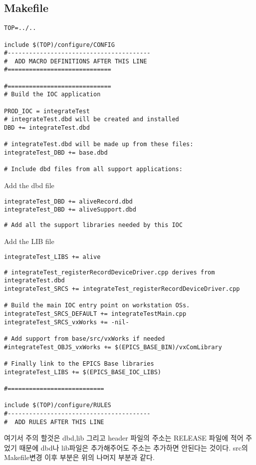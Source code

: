 \documentclass[11pt
  , a4paper
  , article
  , oneside
]{memoir}
\begin{document}
\subsection{Makefile}
\begin{lstlisting}[style=termstyle]
TOP=../..

include $(TOP)/configure/CONFIG
#----------------------------------------
#  ADD MACRO DEFINITIONS AFTER THIS LINE
#=============================

#=============================
# Build the IOC application

PROD_IOC = integrateTest
# integrateTest.dbd will be created and installed
DBD += integrateTest.dbd

# integrateTest.dbd will be made up from these files:
integrateTest_DBD += base.dbd

# Include dbd files from all support applications:
\end{lstlisting}
Add the dbd file
\begin{lstlisting}[style=termstyle]
integrateTest_DBD += aliveRecord.dbd
integrateTest_DBD += aliveSupport.dbd
\end{lstlisting}
\begin{lstlisting}[style=termstyle]
# Add all the support libraries needed by this IOC
\end{lstlisting}
Add the LIB file
\begin{lstlisting}[style=termstyle]
integrateTest_LIBS += alive
\end{lstlisting}
\begin{lstlisting}[style=termstyle]
# integrateTest_registerRecordDeviceDriver.cpp derives from integrateTest.dbd
integrateTest_SRCS += integrateTest_registerRecordDeviceDriver.cpp

# Build the main IOC entry point on workstation OSs.
integrateTest_SRCS_DEFAULT += integrateTestMain.cpp
integrateTest_SRCS_vxWorks += -nil-

# Add support from base/src/vxWorks if needed
#integrateTest_OBJS_vxWorks += $(EPICS_BASE_BIN)/vxComLibrary

# Finally link to the EPICS Base libraries
integrateTest_LIBS += $(EPICS_BASE_IOC_LIBS)

#===========================

include $(TOP)/configure/RULES
#----------------------------------------
#  ADD RULES AFTER THIS LINE
\end{lstlisting}
여기서 주의 할것은 dbd,lib 그리고 header 파일의 주소는 RELEASE 파일에 적어 주었기 때문에 dbd나 lib파일은 추가해주어도 주소는 추가하면 안된다는 것이다.
src의 Makefile변경 이후 부분은 위의 나머지 부분과 같다.
\clearpage
\end{document}
